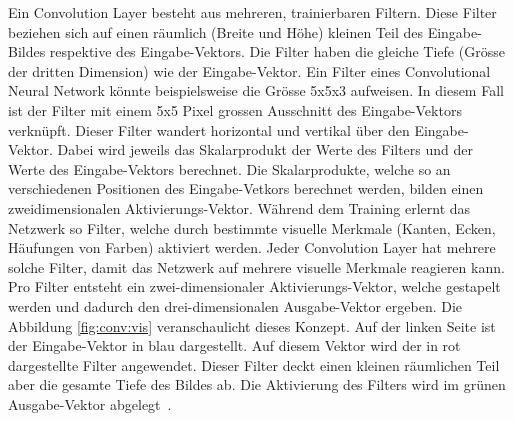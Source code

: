 Ein Convolution Layer besteht aus mehreren, trainierbaren Filtern. Diese Filter beziehen sich auf einen räumlich (Breite und Höhe) kleinen Teil des Eingabe-Bildes respektive des Eingabe-Vektors. Die Filter haben die gleiche Tiefe (Grösse der dritten Dimension) wie der Eingabe-Vektor. Ein Filter eines Convolutional Neural Network könnte beispielsweise die Grösse 5x5x3 aufweisen. In diesem Fall ist der Filter mit einem 5x5 Pixel grossen Ausschnitt des Eingabe-Vektors verknüpft. Dieser Filter wandert horizontal und vertikal über den Eingabe-Vektor. Dabei wird jeweils das Skalarprodukt der Werte des Filters und der Werte des Eingabe-Vektors berechnet. Die Skalarprodukte, welche so an verschiedenen Positionen des Eingabe-Vetkors berechnet werden, bilden einen zweidimensionalen Aktivierungs-Vektor. Während dem Training erlernt das Netzwerk so Filter, welche durch bestimmte visuelle Merkmale (Kanten, Ecken, Häufungen von Farben) aktiviert werden. Jeder Convolution Layer hat mehrere solche Filter, damit das Netzwerk auf mehrere visuelle Merkmale reagieren kann. Pro Filter entsteht ein zwei-dimensionaler Aktivierungs-Vektor, welche gestapelt werden und dadurch den drei-dimensionalen Ausgabe-Vektor ergeben. Die Abbildung \ref{fig:conv:vis} veranschaulicht dieses Konzept. Auf der linken Seite ist der Eingabe-Vektor in blau dargestellt. Auf diesem Vektor wird der in rot dargestellte Filter angewendet. Dieser Filter deckt einen kleinen räumlichen Teil aber die gesamte Tiefe des Bildes ab. Die Aktivierung des Filters wird im grünen Ausgabe-Vektor abgelegt~\autocite{CNN}.


